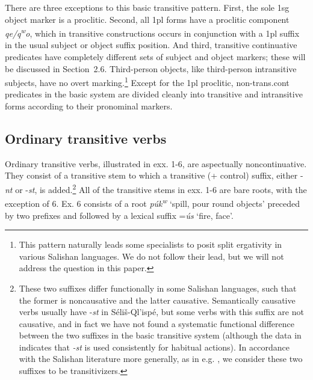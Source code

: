 \documentclass[output=paper,colorlinks,citecolor=brown]{langscibook}
\begin{document}
There are three exceptions to this basic transitive pattern.  First,
the sole 1sg object marker is a proclitic.  Second, all 1pl forms have
a proclitic component \emph{qe/{q\textsuperscript w}o}, which in
transitive constructions occurs in conjunction with a 1pl suffix in the
usual subject or object suffix position.  And third, transitive
continuative predicates have completely different sets of subject and
object markers; these will be discussed in Section~2.6.  Third-person
objects, like third-person intransitive subjects, have no overt
marking.\footnote{This pattern naturally leads some specialists to
posit split ergativity in various Salishan languages.  We do not
follow their lead, but we will not address the question in this
paper.}  Except for the 1pl proclitic, non-trans.cont predicates in
the basic system are divided cleanly into transitive and intransitive
forms according to their pronominal markers.

\subsection{Ordinary transitive verbs}  %

  Ordinary transitive verbs, illustrated in exx. 1-6, are aspectually
  noncontinuative.  They consist of a transitive stem to which a
  transitive (+ control) suffix, either -\emph{nt} or -\emph{st}, is
  added.\footnote{These two suffixes differ functionally in some
  Salishan languages, such that the former is noncausative and the
  latter causative.  Semantically causative verbs usually have
  -\emph{st} in S\'eli\v{s}-Ql'isp\'e, but some verbs with this
  suffix are not causative, and in fact we have not found a
  systematic functional difference between the two suffixes in the
  basic transitive system (although the data in
  \cite{Mengarinietal.:1877} indicates that \emph{-st} is used
  consistently for habitual actions). In accordance with the Salishan
  literature more generally, as in
  e.g. \cite[23--24]{Mattina&Montler:1990}, we consider these
  two suffixes to be transitivizers.}  All of the transitive stems in
  exx. 1-6 are bare roots, with the exception of 6.  Ex. 6 consists
  of a root \emph{p\'uk\textsuperscript w} `spill, pour round
  objects' preceded by two prefixes and followed by a lexical suffix
  =\emph{\'us} `fire, face'.
\end{document}
